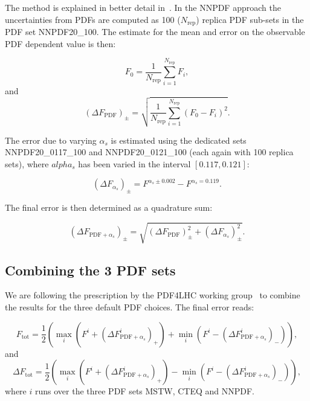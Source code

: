 The method is explained in better detail in~\cite{nnpdf}. In the NNPDF approach the 
uncertainties from PDFs are computed as 100 ($N_\mathrm{rep}$) replica PDF sub-sets 
in the PDF set NNPDF20\_100. 
The estimate for the mean and error on the observable PDF dependent value is then:

\begin{equation}
F_0=\frac{1}{N_\mathrm{rep}}\sum_{i=1}^{N_\mathrm{rep}}F_i,
\end{equation}
and
\begin{equation}
\left(\Delta F_\mathrm{PDF}\right)_\pm=\sqrt{\frac{1}{N_\mathrm{rep}}\sum_{i=1}^{N_\mathrm{rep}}\left(F_0-F_i\right)^2}.
\end{equation}

The error due to varying $\alpha_s$ is estimated using the dedicated sets NNPDF20\_0117\_100 
and NNPDF20\_0121\_100 (each again with 100 replica sets), where $alpha_s$ has been 
varied in the interval $[0.117,0.121]$:

\begin{equation}
\left(\Delta F_{\alpha_s}\right)_\pm=F^{\alpha_s\pm0.002} - F^{\alpha_s=0.119}.
\end{equation}

The final error is then determined as a quadrature sum:

\begin{equation}
\left(\Delta F_{\mathrm{PDF}+\alpha_s}\right)_\pm=\sqrt{\left(\Delta F_{\mathrm{PDF}}\right)_\pm^2+\left(\Delta F_{\alpha_s}\right)_{\pm}^2}.
\end{equation}


\subsection*{Combining the 3 PDF sets}

We are following the prescription by the PDF4LHC working group~\cite{pdf4lhc} to combine the 
results for the three default PDF choices. The final error reads:

\begin{equation}
F_\mathrm{tot}=\frac{1}{2}\left(\max_{i}\left(F^i+\left(\Delta F_{\mathrm{PDF}+\alpha_s}^i\right)_+\right)+
\min_{i}\left(F^i-\left(\Delta F_{\mathrm{PDF}+\alpha_s}^i\right)_-\right)\right),
\end{equation}
and
\begin{equation}
\Delta F_\mathrm{tot}=\frac{1}{2}\left(\max_{i}\left(F^i+\left(\Delta F_{\mathrm{PDF}+\alpha_s}^i\right)_+\right)-
\min_{i}\left(F^i-\left(\Delta F_{\mathrm{PDF}+\alpha_s}^i\right)_-\right)\right),
\end{equation}
where $i$ runs over the three PDF sets MSTW, CTEQ and NNPDF.


